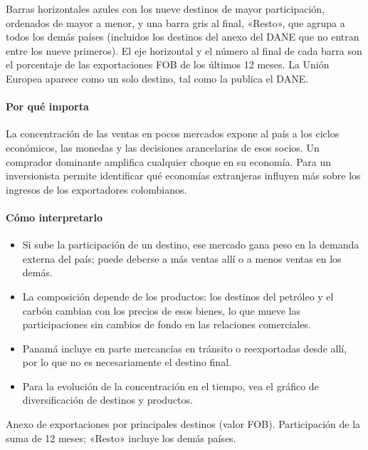\begin{leer}
Barras horizontales azules con los nueve destinos de mayor participación, ordenados de mayor a menor, y una barra gris al final, «Resto», que agrupa a todos los demás países (incluidos los destinos del anexo del DANE que no entran entre los nueve primeros). El eje horizontal y el número al final de cada barra son el porcentaje de las exportaciones FOB de los últimos 12 meses. La Unión Europea aparece como un solo destino, tal como la publica el DANE.
\end{leer}

\paragraph{Por qué importa}
La concentración de las ventas en pocos mercados expone al país a los ciclos económicos, las monedas y las decisiones arancelarias de esos socios. Un comprador dominante amplifica cualquier choque en su economía. Para un inversionista permite identificar qué economías extranjeras influyen más sobre los ingresos de los exportadores colombianos.

\paragraph{Cómo interpretarlo}
\begin{itemize}
\item Si sube la participación de un destino, ese mercado gana peso en la demanda externa del país; puede deberse a más ventas allí o a menos ventas en los demás.
\item La composición depende de los productos: los destinos del petróleo y el carbón cambian con los precios de esos bienes, lo que mueve las participaciones sin cambios de fondo en las relaciones comerciales.
\item Panamá incluye en parte mercancías en tránsito o reexportadas desde allí, por lo que no es necesariamente el destino final.
\item Para la evolución de la concentración en el tiempo, vea el gráfico de diversificación de destinos y productos.
\end{itemize}
\begin{formulas}[Fórmulas]
\end{formulas}
\begin{metodo}[Metodología]
Anexo de exportaciones por principales destinos (valor FOB). Participación de la suma de 12 meses; «Resto» incluye los demás países.
\par{}
\end{metodo}

